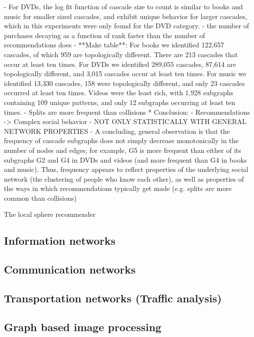 	- For DVDs, the log fit function of cascade size to count is similar to books and music for smaller sized cascades, and exhibit unique behavior for larger cascades, which in this experiments were only found for the DVD category.
	- the number of purchases decaying as a function of rank faster than the number of recommendations does
	- **Make table**: For books we identified 122,657 cascades, of which 959 are topologically different. There are 213 cascades that occur at least ten times. For DVDs we identified 289,055 cascades, 87,614 are topologically different, and 3,015 cascades occur at least ten times. For music we identified 13,330 cascades, 158 were topologically different, and only 23 cascades occurred at least ten times. Videos were the least rich, with 1,928 subgraphs containing 109 unique patterns, and only 12 subgraphs occurring at least ten times.
	- Splits are more frequent than collisions
	* Conclusion:
	- Recommendations -> Complex social behavior
	- NOT ONLY STATISTICALLY WITH GENERAL NETWORK PROPERTIES
	- A concluding, general observation is that the frequency of cascade subgraphs does not simply decrease monotonically in the number of nodes and edges; for example, G5 is more frequent than either of its subgraphs G2 and G4 in DVDs and videos (and more frequent than G4 in books and music). Thus, frequency appears to reflect properties of the underlying social network (the clustering of people who know each other), as well as properties of the ways in which recommendations typically get made (e.g. splits are more common than collisions)
	
	The local sphere recommender
	
	
	\subsection{Information networks}
	\label{ssect:app_information_networks}
	
	\subsection{Communication networks}
	\label{ssect:app_communication_networks}
	
	\subsection{Transportation networks (Traffic analysis)}
	\label{ssect:app_transportation_networks}
	
	\subsection{Graph based image processing}
	\label{ssect:app_graph_img_proc}
	
